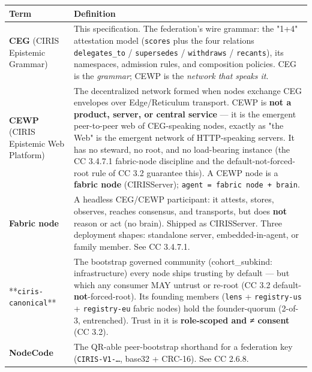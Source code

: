 \documentclass[11pt]{article}
\begin{document}
{\footnotesize
\begin{longtable}{|p{8.0cm}|p{8.0cm}|}\hline
\textbf{Term} & \textbf{Definition} \\ \hline\endhead
\textbf{CEG} (CIRIS Epistemic Grammar) & This specification. The federation's wire grammar: the "1+4" attestation model (\texttt{scores} plus the four relations \texttt{delegates\_to} / \texttt{supersedes} / \texttt{withdraws} / \texttt{recants}), its namespaces, admission rules, and composition policies. CEG is the \textit{grammar}; CEWP is the \textit{network that speaks it}. \\ \hline
\textbf{CEWP} (CIRIS Epistemic Web Platform) & The decentralized network formed when nodes exchange CEG envelopes over Edge/Reticulum transport. CEWP is \textbf{not a product, server, or central service} — it is the emergent peer-to-peer web of CEG-speaking nodes, exactly as "the Web" is the emergent network of HTTP-speaking servers. It has no steward, no root, and no load-bearing instance (the CC 3.4.7.1 fabric-node discipline and the default-not-forced-root rule of CC 3.2 guarantee this). A CEWP node is a \textbf{fabric node} (CIRISServer); \texttt{agent = fabric node + brain}. \\ \hline
\textbf{Fabric node} & A headless CEG/CEWP participant: it attests, stores, observes, reaches consensus, and transports, but does \textbf{not} reason or act (no brain). Shipped as CIRISServer. Three deployment shapes: standalone server, embedded-in-agent, or family member. See CC 3.4.7.1. \\ \hline
**\texttt{ciris-canonical}** & The bootstrap governed community (cohort\_subkind: infrastructure) every node ships trusting by default — but which any consumer MAY untrust or re-root (CC 3.2 default-\textbf{not}-forced-root). Its founding members (\texttt{lens} + \texttt{registry-us} + \texttt{registry-eu} fabric nodes) hold the founder-quorum (2-of-3, entrenched). Trust in it is \textbf{role-scoped and ≠ consent} (CC 3.2). \\ \hline
\textbf{NodeCode} & The QR-able peer-bootstrap shorthand for a federation key (\texttt{CIRIS-V1-…}, base32 + CRC-16). See CC 2.6.8. \\ \hline

\end{longtable}}
\end{document}
